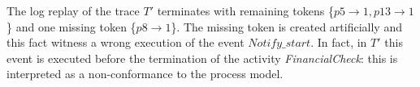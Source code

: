 \documentclass{llncs}
\begin{document}
The log replay of the trace $T'$ terminates with remaining tokens \{${p5 \rightarrow 1,p13 \rightarrow 1}$\} and one missing token \{${p8 \rightarrow 1}$\}. The missing token is created artificially and this fact witness a wrong execution of the event $Notify\_start$. In fact, in $T'$ this event is executed before the termination of the activity \emph{FinancialCheck}: this is interpreted as a non-conformance to the process model. 

\end{document}
